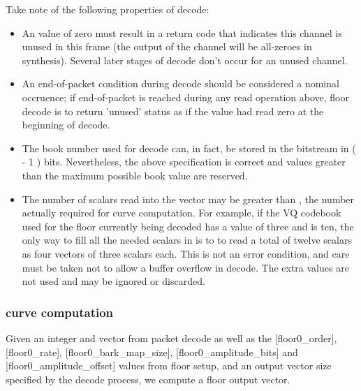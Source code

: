 Take note of the following properties of decode:
\begin{itemize}
 \item An \varname{[amplitude]} value of zero must result in a return code that indicates this channel is unused in this frame (the output of the channel will be all-zeroes in synthesis).  Several later stages of decode don't occur for an unused channel.
 \item An end-of-packet condition during decode should be considered a
nominal occruence; if end-of-packet is reached during any read
operation above, floor decode is to return 'unused' status as if the
\varname{[amplitude]} value had read zero at the beginning of decode.

 \item The book number used for decode
can, in fact, be stored in the bitstream in (  -
1 ) bits.  Nevertheless, the above specification is correct and values
greater than the maximum possible book value are reserved.

 \item The number of scalars read into the vector \varname{[coefficients]}
may be greater than , the number actually
required for curve computation.  For example, if the VQ codebook used
for the floor currently being decoded has a
 value of three and
 is ten, the only way to fill all the needed
scalars in \varname{[coefficients]} is to to read a total of twelve
scalars as four vectors of three scalars each.  This is not an error
condition, and care must be taken not to allow a buffer overflow in
decode. The extra values are not used and may be ignored or discarded.
\end{itemize}




\subsubsection{curve computation} \label{vorbis:spec:floor0-synth}

Given an \varname{[amplitude]} integer and \varname{[coefficients]}
vector from packet decode as well as the [floor0_order],
[floor0_rate], [floor0_bark_map_size], [floor0_amplitude_bits] and
[floor0_amplitude_offset] values from floor setup, and an output
vector size \varname{[n]} specified by the decode process, we compute a
floor output vector.

